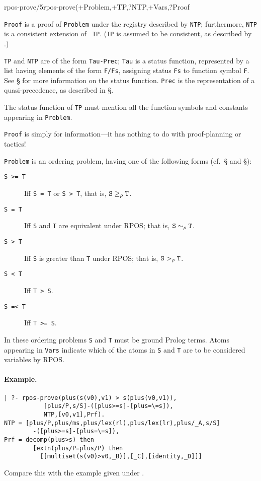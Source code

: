 \begin{predicate}{rpos-prove/5}{rpos-prove(+Problem,+TP,?NTP,+Vars,?Proof}%

{\tt Proof} is a proof of {\tt Problem} under the registry described
by {\tt NTP}; furthermore, {\tt NTP} is a consistent extension of {\tt
TP}.  ({\tt TP} is assumed to be consistent, as described by
.)

{\tt TP} and {\tt NTP} are of the form {\tt Tau-Prec}; {\tt Tau} is a
status function, represented by a list having elements of the form
{\tt F/Fs}, assigning status {\tt Fs} to function symbol {\tt F}.  See
\S{} for more information on the status function.
{\tt Prec} is the representation of a quasi-precedence, as described
in \S{}.

The status function of {\tt TP}  must mention all the function symbols
and constants appearing in {\tt Problem}.

{\tt Proof} is simply for information---it has nothing to do with
proof-planning or tactics! 

{\tt Problem} is an ordering problem, having one of the following
forms (cf.~\S{} and \S{}):
\begin{description}
\item [{\tt S >= T}] Iff  {\tt S = T}  or {\tt S > T}, that is, ${\tt
S}\geq_\rho {\tt T}$. 
\item [{\tt S = T}] Iff {\tt S} and {\tt T} are equivalent under RPOS;
that is, ${\tt S}\sim_\rho {\tt T}$.\index{$\Equiv_\rho$}
\item [{\tt S > T}] Iff {\tt S} is greater than {\tt T} under RPOS;
that is, ${\tt S}>_\rho {\tt T}$.\index{$\RPOS_\rho$}
\item [{\tt S < T}] Iff {\tt T > S}.
\item [{\tt S =< T}] Iff {\tt T >= S}.
\end{description}
In these ordering problems {\tt S} and {\tt T} must be ground Prolog
terms.   Atoms appearing in {\tt Vars} indicate which of the atoms in
{\tt S} and {\tt T} are to be considered variables by RPOS.

\paragraph {Example.}
\begin{verbatim}
| ?- rpos-prove(plus(s(v0),v1) > s(plus(v0,v1)),
           [plus/P,s/S]-([plus>=s]-[plus=\=s]),
           NTP,[v0,v1],Prf).
NTP = [plus/P,plus/ms,plus/lex(rl),plus/lex(lr),plus/_A,s/S]
        -([plus>=s]-[plus=\=s]),
Prf = decomp(plus>s) then
        [extn(plus/P=plus/P) then
          [[multiset(s(v0)>v0,_B)],[_C],[identity,_D]]]
\end{verbatim}
Compare this with the example given under .
\end{predicate}

